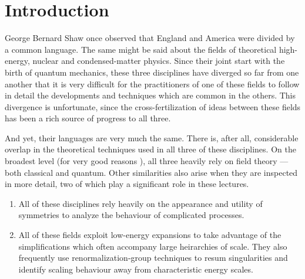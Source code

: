 \maketitle


\section{Introduction}

George Bernard Shaw once observed that England and America
were divided by a common language. The same might be
said about the fields of theoretical high-energy, nuclear and 
condensed-matter physics. 
Since their joint start with the birth of quantum mechanics,
these three disciplines have diverged so far from one
another that it is very difficult for the practitioners of one
of these fields to follow in detail the developments and
techniques which are common in the others. This divergence
is unfortunate, since the cross-fertilization of ideas between
these fields has been a rich source of progress to all three.

And yet, their languages are very much the same.
There is, after all, considerable overlap in the 
theoretical techniques used in all three of these disciplines. 
On the broadest level (for very good reasons 
\cite{Weinberg96,Weinberg95/96}), 
all three heavily rely on field theory --- both classical and quantum. 
Other similarities also arise when they are inspected in more
detail, two of which play a significant role in these lectures. 

\begin{enumerate}
\item
All of these disciplines rely heavily on the appearance and utility 
of symmetries to analyze the behaviour of complicated processes. 
%
\item
All of these fields exploit low-energy expansions to take
advantage of the simplifications which often accompany large
heirarchies of scale. They also frequently use renormalization-group
techniques to resum singularities and identify scaling behaviour
away from characteristic energy scales. 
%
\end{enumerate}

